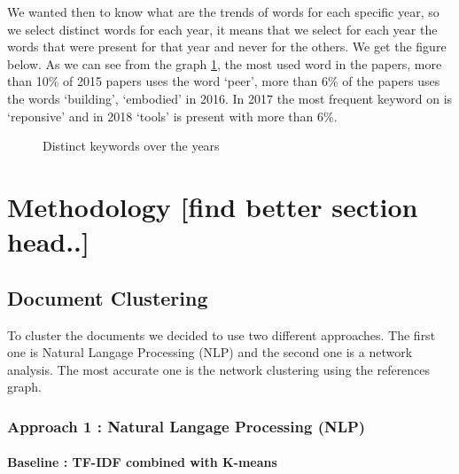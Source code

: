 \documentclass[article,twocolumn]{IEEEtran}
\begin{document}
    We wanted then to know what are the trends of words for each specific
year, so we select distinct words for each year, it means that we select
for each year the words that were present for that year and never for
the others. We get the figure below. As we can see from the graph
\ref{fig2}, the most used word in the papers, more than 10\% of 2015
papers uses the word `peer', more than 6\% of the papers uses the words
`building', `embodied' in 2016. In 2017 the most frequent keyword on is
`reponsive' and in 2018 `tools' is present with more than 6\%.


    \begin{figure}
        \begin{center}\end{center}
        \caption{Distinct keywords over the years}
        \label{fig2}
    \end{figure}
    
    \hypertarget{methodology-find-better-section-head..}{%
\section{Methodology {[}find better section
head..{]}}\label{methodology-find-better-section-head..}}

    \hypertarget{document-clustering}{%
\subsection{Document Clustering}\label{document-clustering}}

To cluster the documents we decided to use two different approaches. The
first one is Natural Langage Processing (NLP) and the second one is a
network analysis. The most accurate one is the network clustering using
the references graph.

\hypertarget{approach-1-natural-langage-processing-nlp}{%
\subsubsection{Approach 1 : Natural Langage Processing
(NLP)}\label{approach-1-natural-langage-processing-nlp}}

\hypertarget{baseline-tf-idf-combined-with-k-means}{%
\paragraph{Baseline : TF-IDF combined with
K-means}\label{baseline-tf-idf-combined-with-k-means}}
\end{document}
